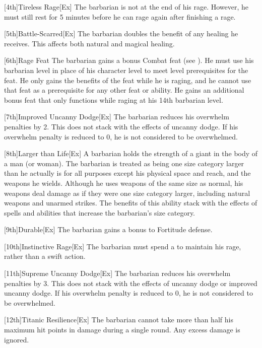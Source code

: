         [4th]{Tireless Rage}[Ex]
        The barbarian is not \fatigued at the end of his rage.
        However, he must still rest for 5 minutes before he can rage again after finishing a rage.

        [5th]{Battle-Scarred}[Ex]
        The barbarian doubles the benefit of any healing he receives.
        This affects both natural and magical healing.

        [6th]{Rage Feat}
        The barbarian gains a bonus Combat feat (see ).
        He must use his barbarian level in place of his character level to meet level prerequisites for the feat.
        He only gains the benefits of the feat while he is raging, and he cannot use that feat as a prerequisite for any other feat or ability.
        He gains an additional bonus feat that only functions while raging at his 14th barbarian level.

        [7th]{Improved Uncanny Dodge}[Ex]
        The barbarian reduces his overwhelm penalties by 2.
        This does not stack with the effects of uncanny dodge.
        If his overwhelm penalty is reduced to 0, he is not considered to be overwhelmed.

        [8th]{Larger than Life}[Ex]
        A barbarian holds the strength of a giant in the body of a man (or woman).
        The barbarian is treated as being one size category larger than he actually is for all purposes except his physical space and reach, and the weapons he wields.
        Although he uses weapons of the same size as normal, his weapons deal damage as if they were one size category larger, including natural weapons and unarmed strikes.
        The benefits of this ability stack with the effects of spells and abilities that increase the barbarian's size category.

        [9th]{Durable}[Ex]
        The barbarian gains a  bonus to Fortitude defense.

        [10th]{Instinctive Rage}[Ex]
        The barbarian must spend a  to maintain his rage, rather than a swift action.

        [11th]{Supreme Uncanny Dodge}[Ex]
        The barbarian reduces his overwhelm penalties by 3.
        This does not stack with the effects of uncanny dodge or improved uncanny dodge.
        If his overwhelm penalty is reduced to 0, he is not considered to be overwhelmed.

        [12th]{Titanic Resilience}[Ex]
        The barbarian cannot take more than half his maximum hit points in damage during a single round.
        Any excess damage is ignored.

